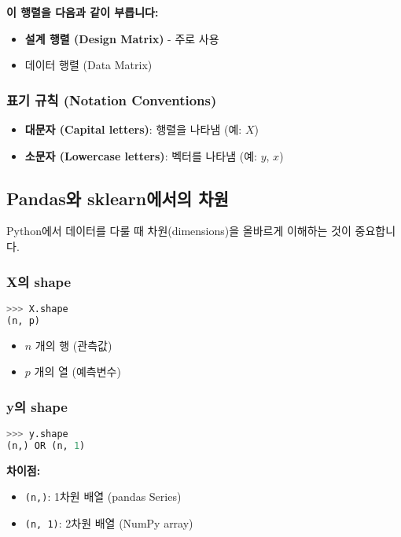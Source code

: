 \documentclass[12pt,a4paper]{article}
\begin{document}
\textbf{이 행렬을 다음과 같이 부릅니다:}
\begin{itemize}
    \item \textbf{설계 행렬 (Design Matrix)} - 주로 사용
    \item 데이터 행렬 (Data Matrix)
\end{itemize}

\subsubsection{표기 규칙 (Notation Conventions)}

\begin{itemize}
    \item \textbf{대문자 (Capital letters)}: 행렬을 나타냄 (예: $X$)
    \item \textbf{소문자 (Lowercase letters)}: 벡터를 나타냄 (예: $y$, $x$)
\end{itemize}

\subsection{Pandas와 sklearn에서의 차원}

Python에서 데이터를 다룰 때 차원(dimensions)을 올바르게 이해하는 것이 중요합니다.

\subsubsection{X의 shape}

\begin{lstlisting}[language=Python]
>>> X.shape
(n, p)
\end{lstlisting}

\begin{itemize}
    \item $n$ 개의 행 (관측값)
    \item $p$ 개의 열 (예측변수)
\end{itemize}

\subsubsection{y의 shape}

\begin{lstlisting}[language=Python]
>>> y.shape
(n,) OR (n, 1)
\end{lstlisting}

\textbf{차이점:}
\begin{itemize}
    \item \texttt{(n,)}: 1차원 배열 (pandas Series)
    \item \texttt{(n, 1)}: 2차원 배열 (NumPy array)
\end{itemize}
\end{document}
